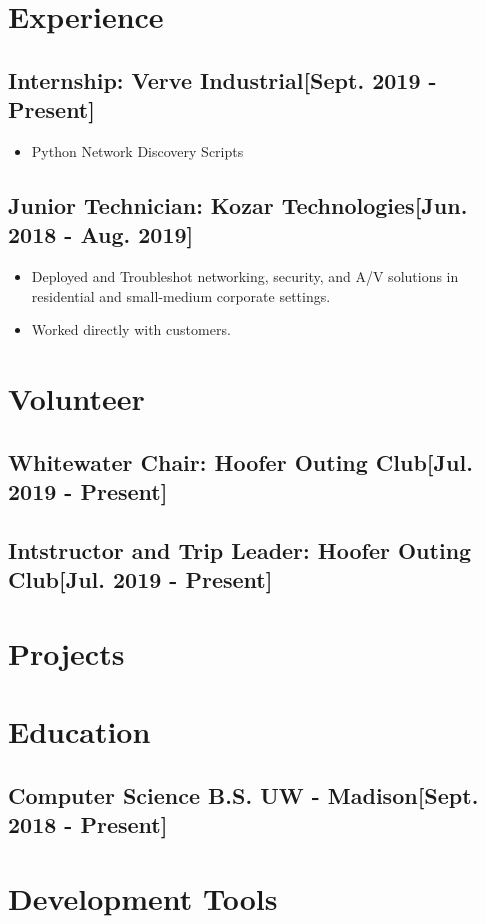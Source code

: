 \documentclass{article}
\begin{document}

\section{Experience}

    \subsection{\textbf{Internship}: Verve Industrial\hfill[Sept. 2019 - Present]}
        \begin{itemize}
            \item Python Network Discovery Scripts
        \end{itemize}

    \subsection{\textbf{Junior Technician}: Kozar Technologies\hfill[Jun. 2018 - Aug. 2019]}
        \begin{itemize}
            \item Deployed and Troubleshot networking, security, and A/V solutions in residential and small-medium corporate settings.
            \item Worked directly with customers.
        \end{itemize}

\section{Volunteer}

    \subsection{\textbf{Whitewater Chair}: Hoofer Outing Club\hfill[Jul. 2019 - Present]}

    \subsection{\textbf{Intstructor and Trip Leader}: Hoofer Outing Club\hfill[Jul. 2019 - Present]}

\section{Projects}

\section{Education}

    \subsection{\textbf{Computer Science B.S.} UW - Madison\hfill[Sept. 2018 - Present]}

\section{Development Tools}
\end{document}
